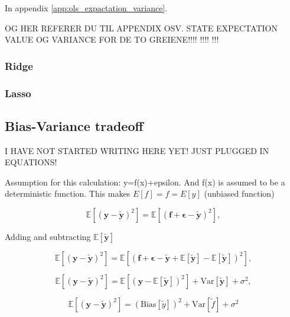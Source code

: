 In appendix \ref{app:ols_expactation_variance}.

OG HER REFERER DU TIL APPENDIX OSV. STATE EXPECTATION VALUE OG VARIANCE FOR DE TO GREIENE!!!!
!!!!
!!!
\subsubsection{Ridge}

\subsubsection{Lasso}

\subsection{Bias-Variance tradeoff}
I HAVE NOT STARTED WRITING HERE YET! JUST PLUGGED IN EQUATIONS!

Assumption for this calculation: y=f(x)+epsilon. And f(x) is assumed to be a deterministic function. This makes $E[f]=f=E[y]$ (unbiased function)

$$
\mathbb{E}\left[(\mathbf{y}-\mathbf{\tilde{y}})^2\right]=\mathbb{E}\left[(\mathbf{f}+\mathbf{\epsilon}-\mathbf{\tilde{y}})^2\right],
$$

Adding and subtracting $\mathbb{E}\left[\mathbf{\tilde{y}}\right]$

$$
\mathbb{E}\left[(\mathbf{y}-\mathbf{\tilde{y}})^2\right]=\mathbb{E}\left[(\mathbf{f}+\mathbf{\epsilon}-\mathbf{\tilde{y}}+\mathbb{E}\left[\mathbf{\tilde{y}}\right]-\mathbb{E}\left[\mathbf{\tilde{y}}\right])^2\right],
$$

$$
\mathbb{E}\left[(\mathbf{y}-\mathbf{\tilde{y}})^2\right]=\mathbb{E}\left[(\mathbf{y}-\mathbb{E}\left[\mathbf{\tilde{y}}\right])^2\right]+\mathrm{Var}\left[\mathbf{\tilde{y}}\right]+\sigma^2,
$$

$$
\mathbb{E}\left[(\mathbf{y}-\mathbf{\tilde{y}})^2\right]=\left(\mbox{Bias}\left[{\tilde y}\right] \right)^2 + \mbox{Var}\left[{\tilde f} \right] + \sigma^2
$$

